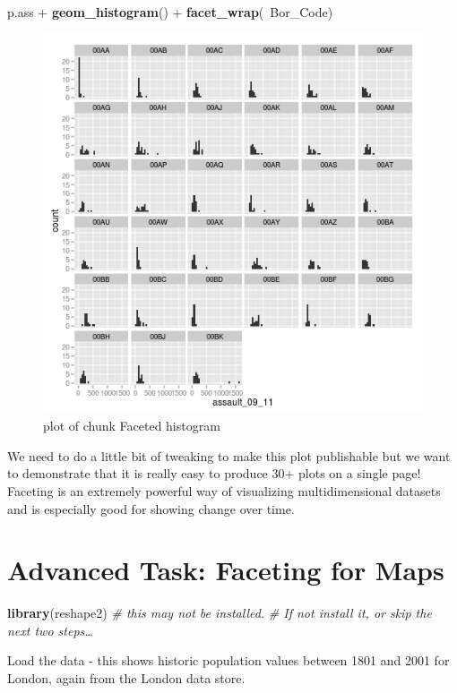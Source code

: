 \documentclass[]{article}
\makeatletter
\newenvironment{Shaded}{}{}
\newcommand{\KeywordTok}[1]{\textcolor[rgb]{0.00,0.44,0.13}{\textbf{{#1}}}}
\newcommand{\CommentTok}[1]{\textcolor[rgb]{0.38,0.63,0.69}{\textit{{#1}}}}
\newcommand{\NormalTok}[1]{{#1}}
\def\maxwidth{\ifdim\Gin@nat@width>\linewidth\linewidth
\else\Gin@nat@width\fi}
\let\Oldincludegraphics\includegraphics
\renewcommand{\includegraphics}[1]{\Oldincludegraphics[width=\maxwidth]{#1}}
\makeatother
\begin{document}
\begin{Shaded}
\begin{Highlighting}[]
\NormalTok{p.ass + }\KeywordTok{geom_histogram}\NormalTok{() + }\KeywordTok{facet_wrap}\NormalTok{(~Bor_Code)}
\end{Highlighting}
\end{Shaded}
\begin{figure}[htbp]
\centering
\includegraphics{figure/Faceted_histogram.png}
\caption{plot of chunk Faceted histogram}
\end{figure}

We need to do a little bit of tweaking to make this plot publishable but
we want to demonstrate that it is really easy to produce 30+ plots on a
single page! Faceting is an extremely powerful way of visualizing
multidimensional datasets and is especially good for showing change over
time.

\section{Advanced Task: Faceting for Maps}

\begin{Shaded}
\begin{Highlighting}[]
\KeywordTok{library}\NormalTok{(reshape2)  }\CommentTok{# this may not be installed. }
\CommentTok{# If not install it, or skip the next two steps…}
\end{Highlighting}
\end{Shaded}
Load the data - this shows historic population values between 1801 and
2001 for London, again from the London data store.
\end{document}
